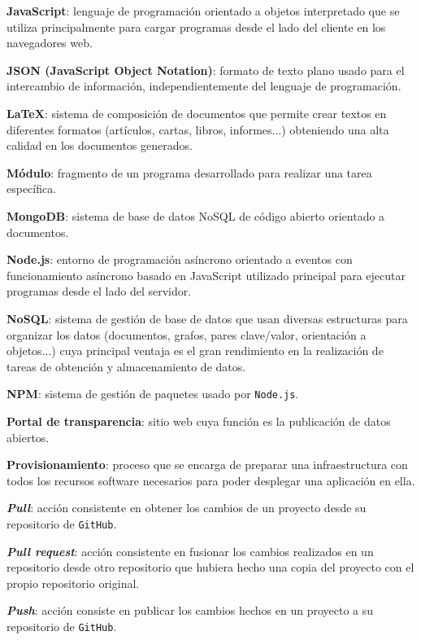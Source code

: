 \textbf{JavaScript}: lenguaje de programación orientado a objetos interpretado que se utiliza principalmente para cargar programas desde el lado del cliente en los navegadores web.
\bigskip

\textbf{JSON (JavaScript Object Notation)}: formato de texto plano usado para el intercambio de información, independientemente del lenguaje de programación.
\bigskip

\textbf{LaTeX}: sistema de composición de documentos que permite crear textos en diferentes formatos (artículos, cartas, libros, informes...) obteniendo una alta calidad en los documentos generados.
\bigskip

\textbf{Módulo}: fragmento de un programa desarrollado para realizar una tarea específica.
\bigskip

\textbf{MongoDB}: sistema de base de datos NoSQL de código abierto orientado a documentos.
\bigskip

\textbf{Node.js}: entorno de programación asíncrono orientado a eventos con funcionamiento asíncrono basado en JavaScript utilizado principal para ejecutar programas desde el lado del servidor.
\bigskip

\textbf{NoSQL}: sistema de gestión de base de datos que usan diversas estructuras para organizar los datos (documentos, grafos, pares clave/valor, orientación a objetos...) cuya principal ventaja es el gran rendimiento en la realización de tareas de obtención y almacenamiento de datos.
\bigskip

\textbf{NPM}: sistema de gestión de paquetes usado por {\tt Node.js}.
\bigskip

\textbf{Portal de transparencia}: sitio web cuya función es la publicación de datos abiertos.
\bigskip

\textbf{Provisionamiento}: proceso que se encarga de preparar una infraestructura con todos los recursos software necesarios para poder desplegar una aplicación en ella.
\bigskip

\textbf{\textit{Pull}}: acción consistente en obtener los cambios de un proyecto desde su repositorio de {\tt GitHub}.
\bigskip

\textbf{\textit{Pull request}}: acción consistente en fusionar los cambios realizados en un repositorio desde otro repositorio que hubiera hecho una copia del proyecto con el propio repositorio original.
\bigskip

\textbf{\textit{Push}}: acción consiste en publicar los cambios hechos en un proyecto a su repositorio de {\tt GitHub}.
\bigskip

